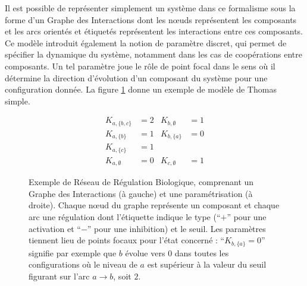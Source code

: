 Il est possible de représenter simplement un système dans ce formalisme sous la forme d'un Graphe des Interactions dont les nœuds représentent les composants et les arcs orientés et étiquetés représentent les interactions entre ces composants.
Ce modèle introduit également la notion de paramètre discret, qui permet de spécifier la dynamique du système, notamment dans les cas de coopérations entre composants.
Un tel paramètre joue le rôle de \og point focal \fg{} dans le sens où il détermine la direction d'évolution d'un composant du système pour une configuration donnée.
La figure \ref{fig:exRRB} donne un exemple de modèle de Thomas simple.

\begin{figure}[ht]
\begin{minipage}{0.4\linewidth}
\centering
{}
\end{minipage}
\begin{minipage}{0.6\linewidth}
\centering
\begin{align*}
K_{a,\{b,c\}} &= 2 & K_{b,\emptyset} &= 1 \\
K_{a,\{b\}} &= 1 & K_{b,\{a\}} &= 0 \\
K_{a,\{c\}} &= 1 &&\\
K_{a,\emptyset} &= 0 & K_{c,\emptyset} &= 1
\end{align*}
\end{minipage}
\caption{\label{fig:exRRB}
Exemple de Réseau de Régulation Biologique, comprenant un Graphe des Interactions (à gauche) et une paramétrisation (à droite).
Chaque nœud du graphe représente un composant et chaque arc une régulation
dont l'étiquette indique le type (“$+$” pour une activation et “$-$” pour une inhibition) et le seuil.
Les paramètres tiennent lieu de points focaux pour l'état concerné :
“$K_{b,\{a\}} = 0$” signifie par exemple que $b$ évolue vers $0$ dans toutes les configurations où le niveau de $a$ est supérieur à la valeur du seuil figurant sur l'arc $a \rightarrow b$, soit $2$.
}
\end{figure}

